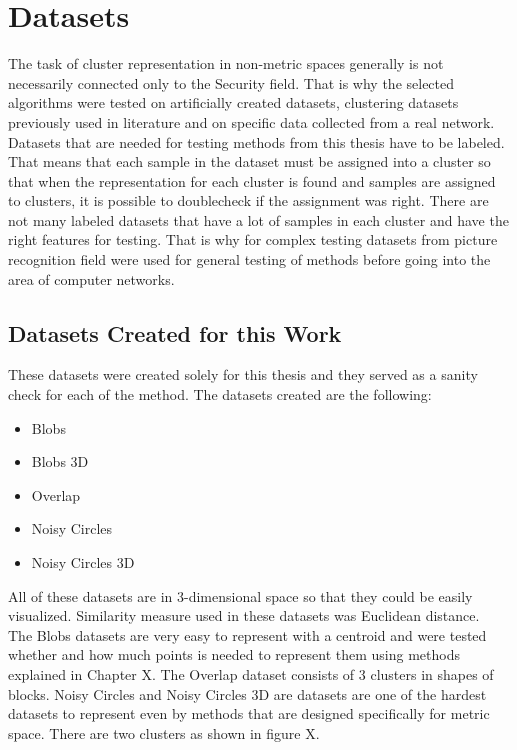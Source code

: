 \documentclass[thesis=B,english]{FITthesis}[2012/10/20]
\begin{document}
\section{Datasets}\label{sec:datasets}
The task of cluster representation in non-metric spaces generally is not necessarily connected only to the Security field.
That is why the selected algorithms were tested on artificially created datasets, clustering datasets previously used in literature and on specific data collected from a real network.
Datasets that are needed for testing methods from this thesis have to be labeled.
That means that each sample in the dataset must be assigned into a cluster so that when the representation for each cluster is found and samples are assigned to clusters, it is possible to doublecheck if the assignment was right.
There are not many labeled datasets that have a lot of samples in each cluster and have the right features for testing. 
That is why for complex testing datasets from picture recognition field were used for general testing of methods before going into the area of computer networks.

\subsection{Datasets Created for this Work}

These datasets were created solely for this thesis and they served as a sanity check for each of the method.
The datasets created are the following:
\begin{itemize}
    \item Blobs
    \item Blobs 3D
    \item Overlap
    \item Noisy Circles
    \item Noisy Circles 3D
\end{itemize}
All of these datasets are in 3-dimensional space so that they could be easily visualized. 
Similarity measure used in these datasets was Euclidean distance. \\

The Blobs datasets are very easy to represent with a centroid and were tested whether and how much points is needed to represent them using methods explained in Chapter X.  The Overlap dataset consists of 3 clusters in shapes of blocks. Noisy Circles and Noisy Circles 3D are datasets are one of the hardest datasets to represent even by methods that are designed specifically for metric space.
There are two clusters as shown in figure X. 
\end{document}

